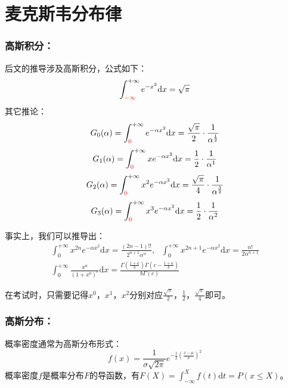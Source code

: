 \documentclass[zihao=5,UTF8]{report}
\begin{document}
\section{麦克斯韦分布律}
\subsubsection{高斯积分：}
后文的推导涉及高斯积分，公式如下：
\begin{equation}
    \int_{\textcolor{red}{-\infty}}^{+\infty}e^{-x^2}\mathrm{d}x = \sqrt{\pi}
\end{equation}
其它推论：
\begin{equation}
    G_0(\alpha) = \int_{\textcolor{red}{0}}^{+\infty} e^{-\alpha x^2}\mathrm{d}x = \frac{\sqrt{\pi }}{2}\cdot \frac{1}{\alpha^{\frac{1}{2}}}
\end{equation}
\begin{equation}
    G_1(\alpha) = \int_{\textcolor{red}{0}}^{+\infty} xe^{-\alpha x^2}\mathrm{d}x = \frac{1}{2}\cdot \frac{1}{\alpha^1}
\end{equation}
\begin{equation}
    G_2(\alpha) = \int_{\textcolor{red}{0}}^{+\infty} x^2e^{-\alpha x^2}\mathrm{d}x = \frac{\sqrt{\pi }}{4}\cdot \frac{1}{\alpha^{\frac{3}{2}}}
\end{equation}
\begin{equation}
    G_3(\alpha) = \int_{\textcolor{red}{0}}^{+\infty} x^3e^{-\alpha x^2}\mathrm{d}x = \frac{1}{2}\cdot \frac{1}{\alpha^2}
\end{equation}\par 
{\color{gray}\small 事实上，我们可以推导出：
\begin{gather}
    \int_{0}^{+\infty }x^{2n}e^{-\alpha x^2}\mathrm{d}x = \frac{(2n-1)!!}{2^{n+1}\alpha^n},\ \ \ \int_{0}^{+\infty} x^{2n+1}e^{-\alpha x^2}\mathrm{d}x = \frac{n!}{2\alpha^{n+1}}\\
    \int_{0}^{+\infty } \frac{x^a}{(1+x^b)^c}\mathrm{d}x = \frac{\Gamma(\frac{1+a}{b})\Gamma(c-\frac{1+a}{b})}{b\Gamma(c)}
\end{gather}\par
在考试时，只需要记得$x^0$，$x^1$，$x^2$分别对应$\frac{\sqrt{\pi}}{2}$，$\frac{1}{2}$，$\frac{\sqrt{ \pi}}{4}$即可。
}
\subsubsection{高斯分布：}
概率密度通常为高斯分布形式：
\begin{equation}
    f(x) = \frac{1}{\sigma\sqrt{2\pi }}e^{-\frac{1}{2}\left(\frac{x-\mu }{\sigma}\right)^2}
\end{equation}
{\color{gray}\small 概率密度$f$是概率分布$F$的导函数，有$F(X) = \int_{-\infty}^{X} f(t)\mathrm{d}t = P(x \le X)$。}
\end{document}
